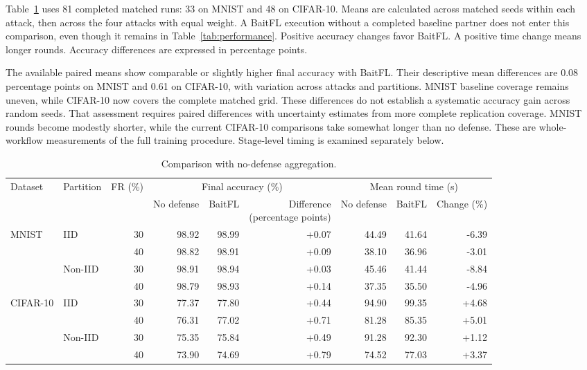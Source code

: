 \documentclass[journal]{IEEEtran}
\begin{document}
Table~\ref{tab:baseline} uses 81 completed matched
runs: 33 on MNIST and
48 on CIFAR-10. Means are calculated across matched seeds within
each attack, then across the four attacks with equal weight. A BaitFL
execution without a completed baseline partner does not enter this
comparison, even though it remains in Table~\ref{tab:performance}.
Positive accuracy changes favor BaitFL. A positive time change means
longer rounds. Accuracy differences are expressed in percentage points.

The available paired means show comparable or slightly higher final
accuracy with BaitFL. Their descriptive mean differences are
0.08 percentage points on MNIST and 0.61
on CIFAR-10, with variation across attacks and partitions. MNIST baseline
coverage remains uneven, while CIFAR-10 now covers the complete matched
grid. These differences do not establish a systematic accuracy gain
across random seeds. That assessment requires paired differences with
uncertainty estimates from more complete replication coverage.
MNIST rounds become modestly shorter, while the current CIFAR-10
comparisons take somewhat longer than no defense. These are whole-workflow
measurements of the full training procedure. Stage-level timing is
examined separately below.

\begin{table}[t]\centering\footnotesize\setlength{\tabcolsep}{5pt}
\caption{Comparison with no-defense aggregation.}\label{tab:baseline}
\begin{tabular}{llrrrrrrr}\toprule
\multirow{2}{*}{Dataset} & \multirow{2}{*}{Partition} & \multirow{2}{*}{FR (\%)} & \multicolumn{3}{c}{Final accuracy (\%)} & \multicolumn{3}{c}{Mean round time (s)} \\
\cmidrule(lr){4-6}\cmidrule(lr){7-9}
& & & No defense & BaitFL & \shortstack{Difference\\(percentage points)} & No defense & BaitFL & Change (\%) \\ \midrule
\multirow{4}{*}{MNIST} & \multirow{2}{*}{IID} & 30 & 98.92 & 98.99 & +0.07 & 44.49 & 41.64 & -6.39 \\
 &  & 40 & 98.82 & 98.91 & +0.09 & 38.10 & 36.96 & -3.01 \\
\cmidrule(lr){2-9}
 & \multirow{2}{*}{Non-IID} & 30 & 98.91 & 98.94 & +0.03 & 45.46 & 41.44 & -8.84 \\
 &  & 40 & 98.79 & 98.93 & +0.14 & 37.35 & 35.50 & -4.96 \\
\midrule
\multirow{4}{*}{CIFAR-10} & \multirow{2}{*}{IID} & 30 & 77.37 & 77.80 & +0.44 & 94.90 & 99.35 & +4.68 \\
 &  & 40 & 76.31 & 77.02 & +0.71 & 81.28 & 85.35 & +5.01 \\
\cmidrule(lr){2-9}
 & \multirow{2}{*}{Non-IID} & 30 & 75.35 & 75.84 & +0.49 & 91.28 & 92.30 & +1.12 \\
 &  & 40 & 73.90 & 74.69 & +0.79 & 74.52 & 77.03 & +3.37 \\
\bottomrule\end{tabular}\end{table}
\end{document}

